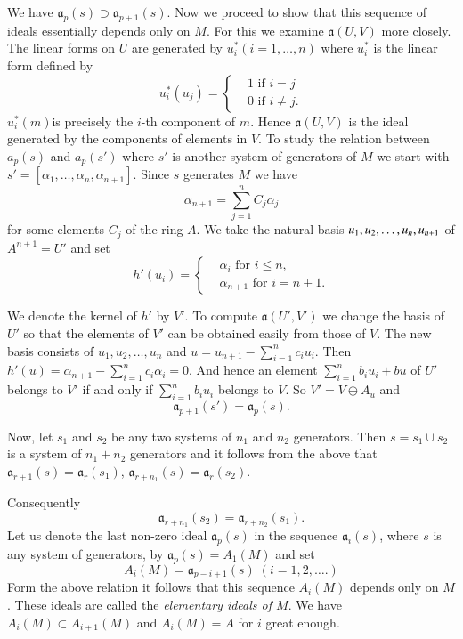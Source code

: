 We have $\mathfrak{a}_p (s) \supset \mathfrak{a}_{p +1} (s)$. Now we proceed to
show that this sequence of ideals essentially depends only on $M$. For
this we examine $\mathfrak{a}(U, V)$ more closely. The linear forms on $U$
are generated by $u^*_i (i = 1, \ldots, n)$ where $u^*_i$ is the linear
form defined by  
$$
u^\ast_i (u_j)= 
\begin{cases}
& 1 \text{ if } i = j\\
& 0 \text{ if } i \neq j.
\end{cases}
$$
$u^\ast_i (m)$\pageoriginale is precisely the $i$-th component of
$m$. Hence $\mathfrak{a} (U, V)$ is the ideal generated by the components of
elements in $V$. To study the relation between $a_p (s)$ and $a_p
(s')$ where $s'$ is another system of generators of $M$ we start with
$s' = [\alpha_1, \ldots, \alpha_n, \alpha_{n+1}]$. Since $s$ generates
$M$ we have  
$$
\alpha_{n+1} = \sum^n_{j=1} C_j \alpha_j
$$
for some elements $C_j$ of the ring $A$. We take the natural basis
$u_1, u_2, \ldots,\break u_n, u_{n+1}$ of $A^{n+1} = U'$ and set 
$$
h' (u_i)= 
\begin{cases}
& \alpha_i \text{ for } i  \leq n,\\
& \alpha_{n +1}\text{ for  } i = n+ 1.
\end{cases}
$$

 
We denote the kernel of $h'$ by $V'$. To compute $\mathfrak{a}(U', V')$ we
change the basis of $U'$ so that the elements of $V'$ can be obtained
easily from those of $V$. The new basis consists of $u_1, u_2, \ldots,
u_n$ and $u = u_{n+1} - \sum\limits^n_{i=1} c_i u_i$. Then $h'(u) =
\alpha_{n+1}-\sum \limits^n_{i=1} c_i \alpha_i = 0 $. And hence an
element $\sum\limits^n_{i=1} b_i u_i + bu$ of $U'$ belongs to $V'$ if
and only if $\sum\limits^n_{i=1} b_i u_i$ belongs to $V$. So $V' = V
\oplus A_u$ and  
$$
\mathfrak{a}_{p+1} (s') = \mathfrak{a}_p (s). 
$$

Now, let $s_1$ and $s_2$ be any two systems of $n_1$ and $n_2$
generators. Then $s = s_1 \cup s_2$ is a system of $n_1 + n_2$
generators and it follows from the above that $\mathfrak{a}_{r +1} (s) =
\mathfrak{a}_{r} (s_1)$, $\mathfrak{a}_{r +n_1}(s) = \mathfrak{a}_{r}(s_2)$. 

Consequently\pageoriginale  
$$
\mathfrak{a}_{r + n_{1}} (s_2) = \mathfrak{a}_{r +n_{2}}(s_1). 
$$
Let us denote the last non-zero ideal $\mathfrak{a}_{p}(s)$ in the sequence
$\mathfrak{a}_{i}(s)$, where $s$ is any system of generators, by
$\mathfrak{a}_{p}(s) = A_1 (M)$ and set  
$$
A_i (M) = \mathfrak{a}_{p-i +1}(s) \; (i = 1, 2, \ldots.)
$$
Form the above relation it follows that this sequence $A_i (M)$
depends only on $M$. These ideals are called the \textit{elementary
  ideals of $M$}. We have $A_i(M) \subset A_{i +1} (M)$ and $A_i (M)
= A$ for $i$ great enough. 

